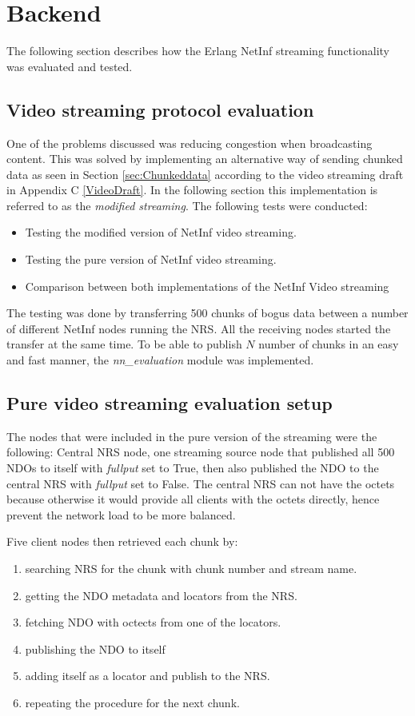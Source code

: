 \section{Backend}

The following section describes how the Erlang NetInf streaming functionality was evaluated and tested. 

\subsection{Video streaming protocol evaluation}
One of the problems discussed was reducing congestion when broadcasting content. 
This was solved by implementing an alternative way of sending chunked data as seen in 
Section \ref{sec:Chunkeddata} according to the video streaming draft in 
Appendix C \ref{VideoDraft}. In the following section this implementation is referred to
as the \textit{modified streaming}. 
The following tests were conducted:

\begin{itemize}
\item Testing the modified version of NetInf video streaming. 
\item Testing the pure version of NetInf video streaming.
\item Comparison between both implementations of the NetInf Video streaming
\end{itemize}

The testing was done by transferring 500 chunks of bogus data between a number of different NetInf nodes running the NRS. 
All the receiving nodes started the transfer at the same time.
To be able to publish $N$ number of chunks in an easy and fast manner, the \textit{nn\_evaluation} module was implemented.

\subsection{Pure video streaming evaluation setup}
The nodes that were included in the pure version of the streaming were the following:
Central NRS node, one streaming source node that published all 500 NDOs to itself with 
\textit{fullput} set to True, then also published the NDO to the central NRS with 
\textit{fullput} set to False. The central NRS can not have the octets 
because otherwise it would provide all clients with the octets directly, 
hence prevent the network load to be more balanced.

Five client nodes then retrieved each chunk by:
\begin{enumerate}
\item searching NRS for the chunk with chunk number and stream name.
\item getting the NDO metadata and locators from the NRS.
\item fetching NDO with octects from one of the locators.
\item publishing the NDO to itself 
\item adding itself as a locator and publish to the NRS.
\item repeating the procedure for the next chunk.
\end{enumerate}

